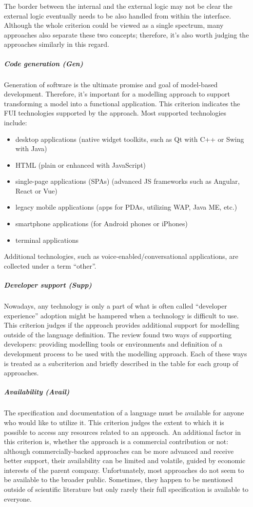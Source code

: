 The border between the internal and the external logic may not be clear\,\textemdash\,the external logic eventually needs to be also handled from within the interface.
Although the whole criterion could be viewed as a single spectrum, many approaches also separate these two concepts;
therefore, it's also worth judging the approaches similarly in this regard.

\subparagraph{Code generation (Gen)}
Generation of software is the ultimate promise and goal of model-based development.
Therefore, it's important for a modelling approach to support transforming a model into a functional application.
This criterion indicates the FUI technologies supported by the approach.
Most supported technologies include:
\begin{itemize}
    \item desktop applications (native widget toolkits, such as Qt with C++ or Swing with Java)
    \item HTML (plain or enhanced with JavaScript)
    \item single-page applications (SPAs) (advanced JS frameworks such as Angular, React or Vue)
    \item legacy mobile applications (apps for PDAs, utilizing WAP, Java ME, etc.)
    \item smartphone applications (for Android phones or iPhones)
    \item terminal applications
\end{itemize}
Additional technologies, such as voice-enabled/conversational applications, are collected under a term \enquote{other}.

\subparagraph{Developer support (Supp)}
Nowadays, any technology is only a part of what is often called \enquote{developer experience}\,\textemdash\,adoption might be hampered when a technology is difficult to use.
This criterion judges if the approach provides additional support for modelling outside of the language definition.
The review found two ways of supporting developers: providing modelling tools or environments and definition of a development process to be used with the modelling approach.
Each of these ways is treated as a subcriterion and briefly described in the table for each group of approaches.

\subparagraph{Availability (Avail)}
The specification and documentation of a language must be available for anyone who would like to utilize it.
This criterion judges the extent to which it is possible to access any resources related to an approach.
An additional factor in this criterion is, whether the approach is a commercial contribution or not: although commercially-backed approaches can be more advanced and receive better support, their availability can be limited and volatile, guided by economic interests of the parent company.
Unfortunately, most approaches do not seem to be available to the broader public.
Sometimes, they happen to be mentioned outside of scientific literature but only rarely their full specification is available to everyone.


